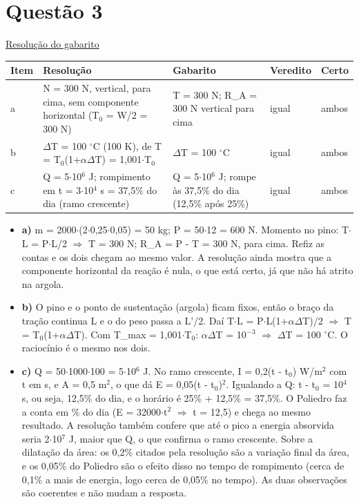 \documentclass{article}%
\begin{document}
\section*{Questão 3}%
\href{https://poliedroresolve.sistemapoliedro.com.br/vestibulares/ime/2027/ime-2-fase-dia-2-27-10-2026-2-fase-dia-2/dissertativa-3-fisica-2-fase-dia-2-ime-2027}{Resolução do gabarito}\par\smallskip%
\begin{longtable}{@{}p{} p{} p{} p{} p{}@{}}\toprule Item & Resolução & Gabarito & Veredito & Certo \\ \midrule
a & N = 300 N, vertical, para cima, sem componente horizontal (T$_{0}$ = W/2 = 300 N) & T = 300 N; R\_A = 300 N vertical para cima & igual & ambos \\
b & $\Delta$T = 100 $^\circ$C (100 K), de T = T$_{0}$(1+$\alpha$$\Delta$T) = 1,001$\cdot$T$_{0}$ & $\Delta$T = 100 $^\circ$C & igual & ambos \\
c & Q = 5$\cdot$10$^{6}$ J; rompimento em t = 3$\cdot$10$^{4}$ s = 37,5\% do dia (ramo crescente) & Q = 5$\cdot$10$^{6}$ J; rompe às 37,5\% do dia (12,5\% após 25\%) & igual & ambos \\
\bottomrule\end{longtable}%
\begin{itemize}%
\item%
\textbf{a)} m = 2000$\cdot$(2$\cdot$0,25$\cdot$0,05) = 50 kg; P = 50$\cdot$12 = 600 N. Momento no pino: T$\cdot$L = P$\cdot$L/2 $\Rightarrow$ T = 300 N; R\_A = P - T = 300 N, para cima. Refiz as contas e os dois chegam ao mesmo valor. A resolução ainda mostra que a componente horizontal da reação é nula, o que está certo, já que não há atrito na argola.%
\item%
\textbf{b)} O pino e o ponto de sustentação (argola) ficam fixos, então o braço da tração continua L e o do peso passa a L'/2. Daí T$\cdot$L = P$\cdot$L(1+$\alpha$$\Delta$T)/2 $\Rightarrow$ T = T$_{0}$(1+$\alpha$$\Delta$T). Com T\_max = 1,001$\cdot$T$_{0}$: $\alpha$$\Delta$T = 10$^{-}$$^3$ $\Rightarrow$ $\Delta$T = 100 $^\circ$C. O raciocínio é o mesmo nos dois.%
\item%
\textbf{c)} Q = 50$\cdot$1000$\cdot$100 = 5$\cdot$10$^{6}$ J. No ramo crescente, I = 0,2(t - t$_{0}$) W/m$^2$ com t em s, e A = 0,5 m$^2$, o que dá E = 0,05(t - t$_{0}$)$^2$. Igualando a Q: t - t$_{0}$ = 10$^{4}$ s, ou seja, 12,5\% do dia, e o horário é 25\% + 12,5\% = 37,5\%. O Poliedro faz a conta em \% do dia (E = 32000$\cdot$t$^2$ $\Rightarrow$ t = 12,5) e chega ao mesmo resultado. A resolução também confere que até o pico a energia absorvida seria 2$\cdot$10$^{7}$ J, maior que Q, o que confirma o ramo crescente. Sobre a dilatação da área: os 0,2\% citados pela resolução são a variação final da área, e os 0,05\% do Poliedro são o efeito disso no tempo de rompimento (cerca de 0,1\% a mais de energia, logo cerca de 0,05\% no tempo). As duas observações são coerentes e não mudam a resposta.%
\end{itemize}%
\end{document}
